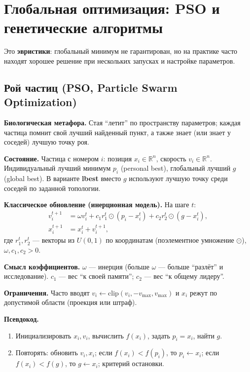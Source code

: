 \documentclass[12pt,a4paper]{article}
\newcommand{\R}{\mathbb{R}}
\begin{document}
\section[Глобальная оптимизация]{Глобальная оптимизация: PSO и генетические алгоритмы}
Это \textbf{эвристики}: глобальный минимум не гарантирован, но на практике часто находят хорошее решение при нескольких запусках и настройке параметров.

\subsection{Рой частиц (PSO, Particle Swarm Optimization)}
\textbf{Биологическая метафора.} Стая ``летит'' по пространству параметров; каждая частица помнит свой лучший найденный пункт, а также знает (или знает у соседей) лучшую точку роя.

\textbf{Состояние.} Частица с номером \(i\): позиция \(x_i\in\R^n\), скорость \(v_i\in\R^n\). Индивидуальный лучший минимум \(p_i\) (personal best), глобальный лучший \(g\) (global best). В варианте \textbf{lbest} вместо \(g\) используют лучшую точку среди соседей по заданной топологии.

\textbf{Классическое обновление (инерционная модель).} На шаге \(t\):
\begin{align*}
  v_i^{t+1} &= \omega v_i^t + c_1 r_1^t\odot(p_i-x_i^t)+c_2 r_2^t\odot(g-x_i^t),\\
  x_i^{t+1} &= x_i^t+v_i^{t+1},
\end{align*}
где \(r_1^t,r_2^t\) --- векторы из \(U(0,1)\) по координатам (поэлементное умножение \(\odot\)), \(\omega,c_1,c_2>0\).

\textbf{Смысл коэффициентов.} \(\omega\) --- инерция (больше \(\omega\) --- больше ``разлёт'' и исследование). \(c_1\) --- вес ``к своей памяти''; \(c_2\) --- вес ``к общему лидеру''.

\textbf{Ограничения.} Часто вводят \(v_i\leftarrow \mathrm{clip}(v_i,-v_{\max},v_{\max})\) и \(x_i\) режут по допустимой области (проекция или штраф).

\textbf{Псевдокод.}
\begin{enumerate}
  \item Инициализировать \(x_i,v_i\), вычислить \(f(x_i)\), задать \(p_i=x_i\), найти \(g\).
  \item Повторять: обновить \(v_i,x_i\); если \(f(x_i)<f(p_i)\), то \(p_i\leftarrow x_i\); если \(f(x_i)<f(g)\), то \(g\leftarrow x_i\); критерий остановки.
\end{enumerate}
\end{document}
